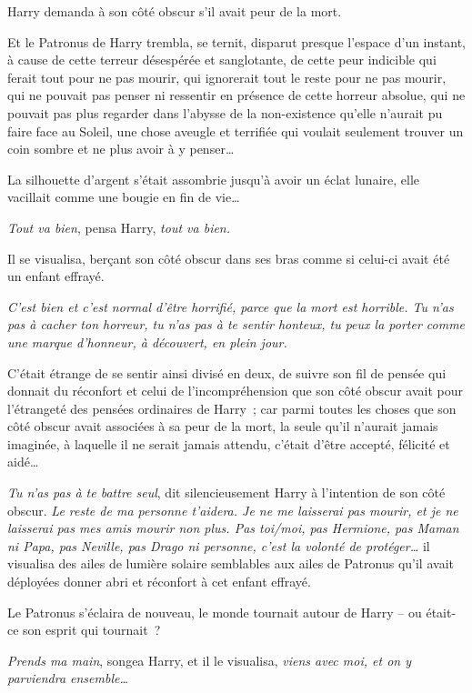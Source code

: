 Harry demanda à son côté obscur s'il avait peur de la mort.

Et le Patronus de Harry trembla, se ternit, disparut presque l'espace d'un instant, à cause de cette terreur désespérée et sanglotante, de cette peur indicible qui ferait tout pour ne pas mourir, qui ignorerait tout le reste pour ne pas mourir, qui ne pouvait pas penser ni ressentir en présence de cette horreur absolue, qui ne pouvait pas plus regarder dans l'abysse de la non-existence qu'elle n'aurait pu faire face au Soleil, une chose aveugle et terrifiée qui voulait seulement trouver un coin sombre et ne plus avoir à y penser…

La silhouette d'argent s'était assombrie jusqu'à avoir un éclat lunaire, elle vacillait comme une bougie en fin de vie…

\emph{Tout va bien}, pensa Harry, \emph{tout va bien.}

Il se visualisa, berçant son côté obscur dans ses bras comme si celui-ci avait été un enfant effrayé.

\emph{C'est bien et c'est normal d'être horrifié, parce que la mort est horrible.
Tu n'as pas à cacher ton horreur, tu n'as pas à te sentir honteux, tu peux la porter comme une marque d'honneur, à découvert, en plein jour.}

C'était étrange de se sentir ainsi divisé en deux, de suivre son fil de pensée qui donnait du réconfort et celui de l'incompréhension que son côté obscur avait pour l'étrangeté des pensées ordinaires de Harry~; car parmi toutes les choses que son côté obscur avait associées à sa peur de la mort, la seule qu'il n'aurait jamais imaginée, à laquelle il ne serait jamais attendu, c'était d'être accepté, félicité et aidé…

\emph{Tu n'as pas à te battre seul}, dit silencieusement Harry à l'intention de son côté obscur.
\emph{Le reste de ma personne t'aidera.
Je ne me laisserai pas mourir, et je ne laisserai pas mes amis mourir non plus.
Pas toi/moi, pas Hermione, pas Maman ni Papa, pas Neville, pas Drago ni personne, c'est la volonté de protéger…} il visualisa des ailes de lumière solaire semblables aux ailes de Patronus qu'il avait déployées donner abri et réconfort à cet enfant effrayé.

Le Patronus s'éclaira de nouveau, le monde tournait autour de Harry -- ou était-ce son esprit qui tournait~?

\emph{Prends ma main}, songea Harry, et il le visualisa, \emph{viens avec moi, et on y parviendra ensemble…}

